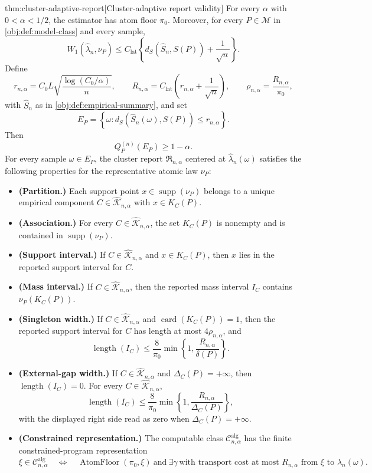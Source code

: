 \begin{theoremv}{thm:cluster-adaptive-report}[Cluster-adaptive report validity]
For every \(\alpha\) with \(0<\alpha<1/2\), the estimator has atom floor \(\pi_0\).  Moreover, for every \(P\in\mathcal M\) in \cref{obj:def:model-class} and every sample,
\[
W_1\!\left(\widehat\lambda_n,\nu_P\right)
\le
C_{\mathrm{lat}}
\left\{
d_S\!\left(\widehat S_n,S(P)\right)+\frac{1}{\sqrt n}
\right\}.
\]
Define
\[
r_{n,\alpha}
=
C_0L\sqrt{\frac{\log(C_0/\alpha)}{n}},
\qquad
R_{n,\alpha}
=
C_{\mathrm{lat}}\left(r_{n,\alpha}+\frac{1}{\sqrt n}\right),
\qquad
\rho_{n,\alpha}=\frac{R_{n,\alpha}}{\pi_0},
\]
with \(\widehat S_n\) as in \cref{obj:def:empirical-summary}, and set
\[
E_P=\left\{\omega:
d_S\!\left(\widehat S_n(\omega),S(P)\right)\le r_{n,\alpha}
\right\}.
\]
Then
\[
Q_P^{(n)}(E_P)\ge 1-\alpha.
\]
For every sample \(\omega\in E_P\), the cluster report \(\mathfrak R_{n,\alpha}\) centered at \(\widehat\lambda_n(\omega)\) satisfies the following properties for the representative atomic law \(\nu_P\):
\begin{itemize}
\item \textbf{(Partition.)} Each support point \(x\in\operatorname{supp}(\nu_P)\) belongs to a unique empirical component \(C\in\widehat{\mathscr K}_{n,\alpha}\) with \(x\in K_C(P)\).
\item \textbf{(Association.)} For every \(C\in\widehat{\mathscr K}_{n,\alpha}\), the set \(K_C(P)\) is nonempty and is contained in \(\operatorname{supp}(\nu_P)\).
\item \textbf{(Support interval.)} If \(C\in\widehat{\mathscr K}_{n,\alpha}\) and \(x\in K_C(P)\), then \(x\) lies in the reported support interval for \(C\).
\item \textbf{(Mass interval.)} If \(C\in\widehat{\mathscr K}_{n,\alpha}\), then the reported mass interval \(I_C\) contains \(\nu_P(K_C(P))\).
\item \textbf{(Singleton width.)} If \(C\in\widehat{\mathscr K}_{n,\alpha}\) and \(\operatorname{card}(K_C(P))=1\), then the reported support interval for \(C\) has length at most \(4\rho_{n,\alpha}\), and
\[
\operatorname{length}(I_C)
\le
\frac{8}{\pi_0}
\min\left\{1,\frac{R_{n,\alpha}}{\delta(P)}\right\}.
\]
\item \textbf{(External-gap width.)} If \(C\in\widehat{\mathscr K}_{n,\alpha}\) and \(\Delta_C(P)=+\infty\), then \(\operatorname{length}(I_C)=0\).  For every \(C\in\widehat{\mathscr K}_{n,\alpha}\),
\[
\operatorname{length}(I_C)
\le
\frac{8}{\pi_0}
\min\left\{1,\frac{R_{n,\alpha}}{\Delta_C(P)}\right\},
\]
with the displayed right side read as zero when \(\Delta_C(P)=+\infty\).
\item \textbf{(Constrained representation.)} The computable class
\(\mathcal C^{\mathrm{alg}}_{n,\alpha}\) has the finite constrained-program representation
\[
\xi\in\mathcal C^{\mathrm{alg}}_{n,\alpha}
\quad\Longleftrightarrow\quad
\operatorname{AtomFloor}(\pi_0,\xi)
\ \text{and}\ 
\exists\gamma\ \text{with transport cost at most } R_{n,\alpha}
\text{ from }\xi\text{ to }\widehat\lambda_n(\omega).
\]
\end{itemize}
\end{theoremv}

